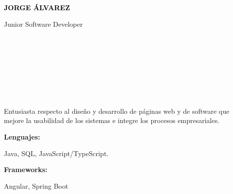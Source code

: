 \documentclass[9pt]{./src/developercv} %
\begin{document}
\begin{minipage}[t]{0.5\textwidth}
	\vspace{-\baselineskip}
	{ \fontsize{16}{20} \textcolor{black}{\textbf{\MakeUppercase{Jorge Álvarez}}}}
	\vspace{6pt}

	{\Large Junior Software Developer}
\end{minipage}
\begin{minipage}[t]{0.2\textwidth}
	\vspace{-\baselineskip}
	\\
	\\
	\\
\end{minipage}
\begin{minipage}[t]{0.3\textwidth}
	\vspace{-\baselineskip}
	\\
	\\
	\\
\end{minipage}

\begin{minipage}[t]{0.46\textwidth}
	\vspace{-6pt}

	Entusiasta respecto al diseño y desarrollo de páginas
	web y de software que mejore la usabilidad de los sistemas
	e integre los procesos empresariales.
\end{minipage}
\hfill
\begin{minipage}[t]{0.465\textwidth}
	\vspace{-6pt}

	\begin{minipage}[t]{0.2\textwidth}
		\textbf{Lenguajes:}
	\end{minipage}
	\hfill
	\begin{minipage}[t]{0.73\textwidth}
		Java, SQL, JavaScript/TypeScript.
	\end{minipage}
	\vspace{4mm}

	\begin{minipage}[t]{0.2\textwidth}
		\textbf{Frameworks:}
	\end{minipage}
	\hfill
	\begin{minipage}[t]{0.73\textwidth}
		Angular, Spring Boot
	\end{minipage}

\end{minipage}
\end{document}
